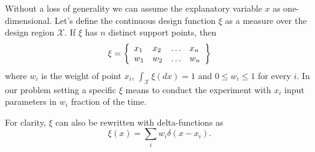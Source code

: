 \documentclass[12pt]{iopart}
\begin{document}
Without a loss of generality we can assume the explanatory variable $x$ as one-dimensional. 
Let's define the continuous design function $\xi$ as a measure over the design region $\mathcal{X}$. If $\xi$ has $n$ distinct support points, then
\begin{equation}
\xi = \left\{
  \begin{array}{l l l l}
    x_1 & x_2 & \ldots & x_n\\
    w_1 & w_2 & \ldots & w_n\\
  \end{array} \right \}
\label{eq:xicont}
\end{equation}
where $w_i$ is the weight of point $x_i$, $\int_{\mathcal{X}}\xi(dx) = 1$ and $0 \leq w_i \leq 1$ for every $i$. In our problem setting a specific $\xi$ means to conduct the experiment with $x_i$ input parameters in $w_i$ fraction of the time.

For clarity, $\xi$ can also be rewritten with delta-functions as
\begin{equation}
\xi(x) = \sum_i w_i \delta(x - x_i).
\label{eq:xidelta}
\end{equation}
\end{document}
